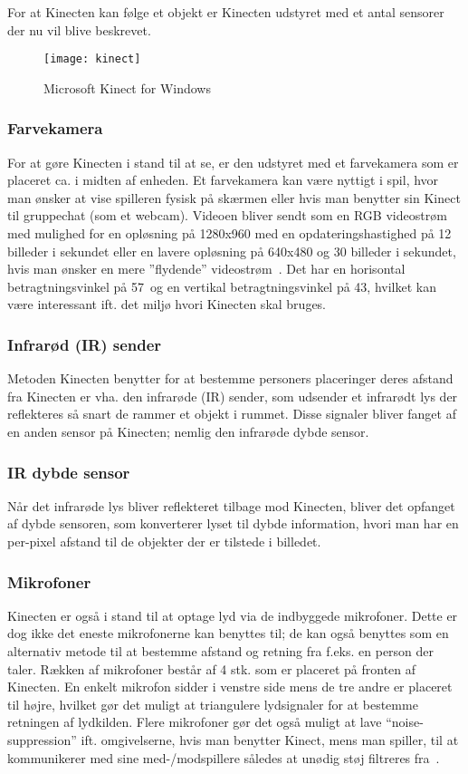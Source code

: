 For at Kinecten kan følge et objekt er Kinecten udstyret med et antal sensorer der nu vil blive beskrevet.

\begin{figure}
\centering
\texttt{[image: kinect]}
\caption{Microsoft Kinect for Windows}
\label{kinect:opbygning}
\end{figure}

\subsubsection{Farvekamera}
For at gøre Kinecten i stand til at se, er den udstyret med et farvekamera som er placeret ca. i midten af enheden.
Et farvekamera kan være nyttigt i spil, hvor man ønsker at vise spilleren fysisk på skærmen eller hvis man benytter sin Kinect til gruppechat (som et webcam).
Videoen bliver sendt som en RGB videostrøm med mulighed for en opløsning på 1280x960 med en opdateringshastighed på 12 billeder i sekundet eller en lavere opløsning på 640x480 og 30 billeder i sekundet, hvis man ønsker en mere ”flydende” videostrøm~\cite{kinectForWindowsFeatures}.
Det har en horisontal betragtningsvinkel på 57\degree~og en vertikal betragtningsvinkel på 43\degree, hvilket kan være interessant ift. det miljø hvori Kinecten skal bruges.

\subsubsection{Infrarød (IR) sender}
Metoden Kinecten benytter for at bestemme personers placeringer deres afstand fra Kinecten er vha. den infrarøde (IR) sender, som udsender et infrarødt lys der reflekteres så snart de rammer et objekt i rummet. 
Disse signaler bliver fanget af en anden sensor på Kinecten; nemlig den infrarøde dybde sensor.

\subsubsection{IR dybde sensor}
Når det infrarøde lys bliver reflekteret tilbage mod Kinecten, bliver det opfanget af dybde sensoren, som konverterer lyset til dybde information, hvori man har en per-pixel afstand til de objekter der er tilstede i billedet.

\subsubsection{Mikrofoner}
Kinecten er også i stand til at optage lyd via de indbyggede mikrofoner.
Dette er dog ikke det eneste mikrofonerne kan benyttes til; de kan også benyttes som en alternativ metode til at bestemme afstand og retning fra f.eks. en person der taler.
Rækken af mikrofoner består af 4 stk. som er placeret på fronten af Kinecten.
En enkelt mikrofon sidder i venstre side mens de tre andre er placeret til højre, hvilket gør det muligt at triangulere lydsignaler for at bestemme retningen af lydkilden.
Flere mikrofoner gør det også muligt at lave ``noise-suppression'' ift. omgivelserne, hvis man benytter Kinect, mens man spiller, til at kommunikerer med sine med-/modspillere således at unødig støj filtreres fra~\cite[s.~15]{kinectProgrammingGuide}.

